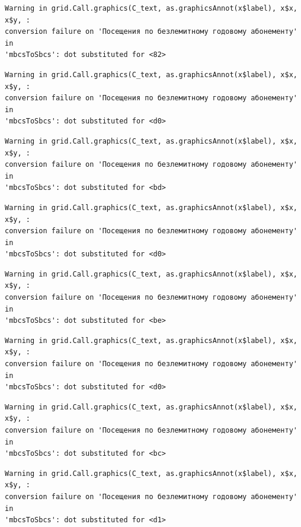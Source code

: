 \documentclass[
  letterpaper,
  DIV=11,
  numbers=noendperiod]{scrartcl}
\begin{document}
\begin{verbatim}
Warning in grid.Call.graphics(C_text, as.graphicsAnnot(x$label), x$x, x$y, :
conversion failure on 'Посещения по безлемитному годовому абонементу' in
'mbcsToSbcs': dot substituted for <82>
\end{verbatim}

\begin{verbatim}
Warning in grid.Call.graphics(C_text, as.graphicsAnnot(x$label), x$x, x$y, :
conversion failure on 'Посещения по безлемитному годовому абонементу' in
'mbcsToSbcs': dot substituted for <d0>
\end{verbatim}

\begin{verbatim}
Warning in grid.Call.graphics(C_text, as.graphicsAnnot(x$label), x$x, x$y, :
conversion failure on 'Посещения по безлемитному годовому абонементу' in
'mbcsToSbcs': dot substituted for <bd>
\end{verbatim}

\begin{verbatim}
Warning in grid.Call.graphics(C_text, as.graphicsAnnot(x$label), x$x, x$y, :
conversion failure on 'Посещения по безлемитному годовому абонементу' in
'mbcsToSbcs': dot substituted for <d0>
\end{verbatim}

\begin{verbatim}
Warning in grid.Call.graphics(C_text, as.graphicsAnnot(x$label), x$x, x$y, :
conversion failure on 'Посещения по безлемитному годовому абонементу' in
'mbcsToSbcs': dot substituted for <be>
\end{verbatim}

\begin{verbatim}
Warning in grid.Call.graphics(C_text, as.graphicsAnnot(x$label), x$x, x$y, :
conversion failure on 'Посещения по безлемитному годовому абонементу' in
'mbcsToSbcs': dot substituted for <d0>
\end{verbatim}

\begin{verbatim}
Warning in grid.Call.graphics(C_text, as.graphicsAnnot(x$label), x$x, x$y, :
conversion failure on 'Посещения по безлемитному годовому абонементу' in
'mbcsToSbcs': dot substituted for <bc>
\end{verbatim}

\begin{verbatim}
Warning in grid.Call.graphics(C_text, as.graphicsAnnot(x$label), x$x, x$y, :
conversion failure on 'Посещения по безлемитному годовому абонементу' in
'mbcsToSbcs': dot substituted for <d1>
\end{verbatim}
\end{document}
